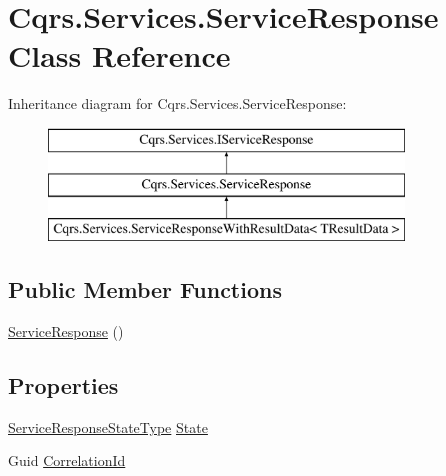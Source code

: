 \hypertarget{classCqrs_1_1Services_1_1ServiceResponse}{}\section{Cqrs.\+Services.\+Service\+Response Class Reference}
\label{classCqrs_1_1Services_1_1ServiceResponse}
Inheritance diagram for Cqrs.\+Services.\+Service\+Response\+:\begin{figure}[H]
\begin{center}
\leavevmode
\includegraphics[height=3.000000cm]{classCqrs_1_1Services_1_1ServiceResponse}
\end{center}
\end{figure}
\subsection*{Public Member Functions}
\begin{DoxyCompactItemize}
\item 
\hyperlink{classCqrs_1_1Services_1_1ServiceResponse_a889c3d406ffbac960699e13616f9f38b_a889c3d406ffbac960699e13616f9f38b}{Service\+Response} ()
\end{DoxyCompactItemize}
\subsection*{Properties}
\begin{DoxyCompactItemize}
\item 
\hyperlink{namespaceCqrs_1_1Services_a41411b784c4fcb7eed0cef2a5b522de0_a41411b784c4fcb7eed0cef2a5b522de0}{Service\+Response\+State\+Type} \hyperlink{classCqrs_1_1Services_1_1ServiceResponse_ab93fe1cf6395706bc77ee3d670854f24_ab93fe1cf6395706bc77ee3d670854f24}{State}
\item 
Guid \hyperlink{classCqrs_1_1Services_1_1ServiceResponse_ad6b80b1b6d1122bcbac201f41ee37124_ad6b80b1b6d1122bcbac201f41ee37124}{Correlation\+Id}
\end{DoxyCompactItemize}


